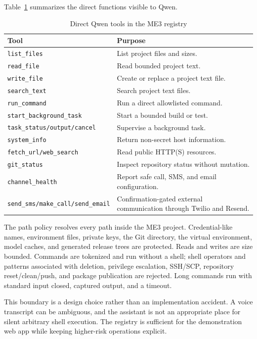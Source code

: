 \documentclass[sigconf,nonacm]{acmart}
\begin{document}
Table~\ref{tab:tools} summarizes the direct functions visible to Qwen.

\begin{table}[t]
\caption{Direct Qwen tools in the ME3 registry}
\label{tab:tools}
\small
\begin{tabularx}{\columnwidth}{@{}lX@{}}
\toprule
Tool & Purpose \\
\midrule
\texttt{list\_files} & List project files and sizes. \\
\texttt{read\_file} & Read bounded project text. \\
\texttt{write\_file} & Create or replace a project text file. \\
\texttt{search\_text} & Search project text files. \\
\texttt{run\_command} & Run a direct allowlisted command. \\
\texttt{start\_background\_task} & Start a bounded build or test. \\
\texttt{task\_status/output/cancel} & Supervise a background task. \\
\texttt{system\_info} & Return non-secret host information. \\
\texttt{fetch\_url/web\_search} & Read public HTTP(S) resources. \\
\texttt{git\_status} & Inspect repository status without mutation. \\
\texttt{channel\_health} & Report safe call, SMS, and email configuration. \\
\texttt{send\_sms/make\_call/send\_email} & Confirmation-gated external
communication through Twilio and Resend. \\
\bottomrule
\end{tabularx}
\end{table}

The path policy resolves every path inside the ME3 project. Credential-like
names, environment files, private keys, the Git directory, the virtual
environment, model caches, and generated release trees are protected. Reads
and writes are size bounded. Commands are tokenized and run without a shell;
shell operators and patterns associated with deletion, privilege escalation,
SSH/SCP, repository reset/clean/push, and package publication are rejected.
Long commands run with standard input closed, captured output, and a timeout.

This boundary is a design choice rather than an implementation accident. A
voice transcript can be ambiguous, and the assistant is not an appropriate
place for silent arbitrary shell execution. The registry is sufficient for the
demonstration web app while keeping higher-risk operations explicit.
\end{document}
